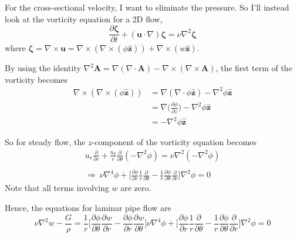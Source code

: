 \documentclass[10pt,a4paper]{report}
\begin{document}
For the cross-sectional velocity, I want to eliminate the pressure. So I'll instead look at the vorticity equation for a 2D flow,
\begin{equation}\label{2dvortex}
\frac{\partial \bm{\zeta}}{\partial t} + (\bm{u} \cdot \nabla)\bm{\zeta} = \nu \nabla^2 \bm{\zeta}
\end{equation}
where $\bm{\zeta} = \nabla \times \bm{u} = \nabla \times (\nabla \times (\phi \hat{\bm{z}})) + \nabla \times (w \hat{\bm{z}})$.

By using the identity $\nabla^2 \bm{A} = \nabla(\nabla \cdot \bm{A}) - \nabla \times (\nabla \times \bm{A})$, the first term of the vorticity becomes
\begin{equation*}
  \begin{split}
\nabla \times (\nabla \times (\phi \hat{\bm{z}})) & = \nabla(\nabla \cdot \phi \hat{\bm{z}}) - \nabla^2 \phi \hat{\bm{z}} \\
 & = \nabla\bigg(\frac{\partial \phi}{\partial z} \bigg) - \nabla^2 \phi \hat{\bm{z}} \\
 & = - \nabla^2 \phi \hat{\bm{z}}
  \end{split}
\end{equation*}

So for steady flow, the $z$-component of the vorticity equation becomes
\begin{eqnarray*}
u_r \frac{\partial}{\partial r} + \frac{u_\theta}{r} \frac{\partial}{\partial \theta}(-\nabla^2 \phi) = \nu \nabla^2 (- \nabla^2 \phi) \\ \\
\Rightarrow \ \nu \nabla^4 \phi + \bigg[\frac{\partial \phi}{\partial r} \frac{1}{r} \frac{\partial}{\partial \theta} - \frac{1}{r} \frac{\partial \phi}{\partial \theta} \frac{\partial}{\partial r} \bigg] \nabla^2 \phi = 0
\end{eqnarray*}
Note that all terms involving $w$ are zero.

Hence, the equations for laminar pipe flow are
\begin{subequations}
\begin{equation}
\nu \nabla^2 w - \frac{G}{\rho} = \frac{1}{r} \bigg[\frac{\partial \phi}{\partial \theta} \frac{\partial w}{\partial r} - \frac{\partial \phi}{\partial r} \frac{\partial w}{\partial \theta}\bigg]
\end{equation}
\begin{equation}\label{straightphi}
\nu \nabla^4 \phi + \bigg[\frac{\partial \phi}{\partial r} \frac{1}{r} \frac{\partial}{\partial \theta} - \frac{1}{r} \frac{\partial \phi}{\partial \theta} \frac{\partial}{\partial r} \bigg] \nabla^2 \phi = 0
\end{equation}
\end{subequations}
\end{document}
